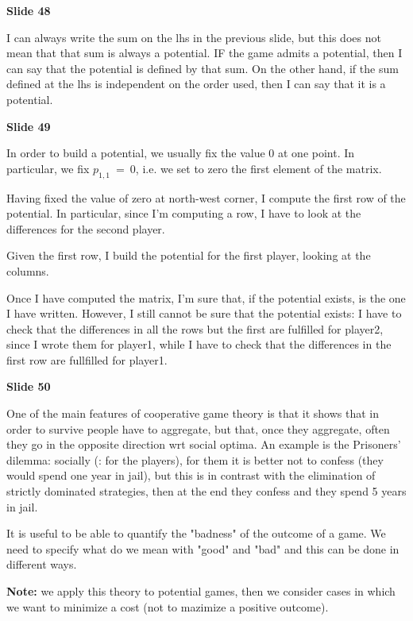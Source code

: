 \documentclass[pt11,a4paper,twoside,reqno,openright]{paper}
\begin{document}
\bigskip
\noindent \textbf{Slide 48} 

\noindent I can always write the sum on the lhs in the previous slide, but 
this does not mean that that sum is always a potential. IF the game admits 
a potential, then I can say that the potential is defined by that sum. On 
the other hand, if the sum defined at the lhs is independent on the order 
used, then I can say that it is a potential.

\bigskip
\noindent \textbf{Slide 49}

\noindent In order to build a potential, we usually fix the value 0 at one 
point. In particular, we fix $p_{1,1}~=~0$, i.e. we set to zero the first 
element of the matrix.

\noindent Having fixed the value of zero at north-west corner, I compute 
the first row of the potential. In particular, since I'm computing a row, 
I have to look at the differences for the second player.

\noindent Given the first row, I build the potential for the first player, 
looking at the columns.

\noindent Once I have computed the matrix, I'm sure that, if the potential 
exists, is the one I have written. However, I still cannot be sure that the 
potential exists: I have to check that the differences in all the rows but 
the first are fulfilled for player2, since I wrote them for player1, while 
I have to check that the differences in the first row are fullfilled for 
player1.

\bigskip
\noindent \textbf{Slide 50}

\noindent One of the main features of cooperative game theory is that it 
shows that in order to survive people have to aggregate, but that, once they 
aggregate, often they go in the opposite direction wrt social optima. An 
example is the Prisoners' dilemma: socially (: for the players), 
for them it is better not to confess (they would spend one year in jail), 
but this is in contrast with the elimination of strictly dominated strategies, 
then at the end they confess and they spend 5 years in jail.

\noindent It is useful to be able to quantify the "badness" of the outcome 
of a game. We need to specify what do we mean with "good" and "bad" and 
this can be done in different ways.

\noindent \textbf{Note:} we apply this theory to potential games, then we 
consider cases in which we want to minimize a cost (not to mazimize a 
positive outcome).
\end{document}
